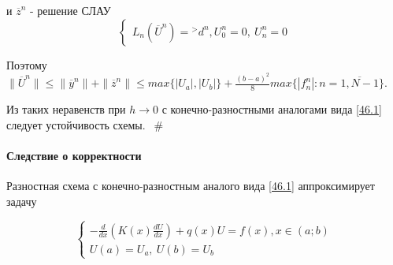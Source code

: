 \documentclass[__main__.tex]{subfiles}
\begin{document}
и $\overline{z}^n$ - решение СЛАУ
\begin{equation}
\begin{cases}
L_n \left(\overline{U}^n\right) = {}^> d^n,
U^n_0 = 0, \ U^n_n = 0 
\end{cases}
\end{equation}

Поэтому $\| \overline{U}^n \| \leq \| \overline{y}^n \| + \| \overline{z}^n \| \leq max \{\left|U_a\right|, \left|U_b\right|\} + \frac{\left(b-a\right)^2}{8} max \{\left|f^n_n\right|: n =\overline{1,N-1}\}$.

Из таких неравенств при $h \rightarrow 0$ с конечно-разностными аналогами вида \ref{46.1} следует устойчивость схемы. $\ \ \#$

\paragraph{Следствие о корректности}

Разностная схема с конечно-разностным аналого вида \ref{46.1} аппроксимирует задачу

\begin{equation}
\begin{cases}
- \frac{d}{dx} \left(K \left(x\right)\frac{dU}{dx}\right) + q \left(x\right) U = f \left(x\right), x \in \left(a;b\right) \\
U \left(a\right) = U_a, \ U\left(b\right) = U_b
\end{cases}
\end{equation}
\end{document}
